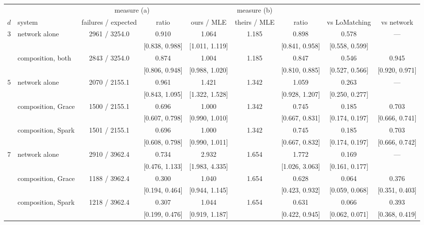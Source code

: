 \begin{tabular}{@{}clccccccc@{}}
\toprule
& & \multicolumn{2}{c}{measure (a)} & \multicolumn{3}{c}{measure (b)} & & \\
\cmidrule(lr){3-4}\cmidrule(lr){5-7}
$d$ & system & failures / expected & ratio & ours / MLE & theirs / MLE & ratio & vs LoMatching & vs network \\
\midrule
3 & network alone & 2961 / 3254.0 & 0.910 & 1.064 & 1.185 & 0.898 & 0.578 & --- \\
 &  &  & {\tiny[0.838, 0.988]} & {\tiny[1.011, 1.119]} &  & {\tiny[0.841, 0.958]} & {\tiny[0.558, 0.599]} &  \\
 & composition, both & 2843 / 3254.0 & 0.874 & 1.004 & 1.185 & 0.847 & 0.546 & 0.945 \\
 &  &  & {\tiny[0.806, 0.948]} & {\tiny[0.988, 1.020]} &  & {\tiny[0.810, 0.885]} & {\tiny[0.527, 0.566]} & {\tiny[0.920, 0.971]} \\
\midrule
5 & network alone & 2070 / 2155.1 & 0.961 & 1.421 & 1.342 & 1.059 & 0.263 & --- \\
 &  &  & {\tiny[0.843, 1.095]} & {\tiny[1.322, 1.528]} &  & {\tiny[0.928, 1.207]} & {\tiny[0.250, 0.277]} &  \\
 & composition, Grace & 1500 / 2155.1 & 0.696 & 1.000 & 1.342 & 0.745 & 0.185 & 0.703 \\
 &  &  & {\tiny[0.607, 0.798]} & {\tiny[0.990, 1.010]} &  & {\tiny[0.667, 0.831]} & {\tiny[0.174, 0.197]} & {\tiny[0.666, 0.741]} \\
 & composition, Spark & 1501 / 2155.1 & 0.696 & 1.000 & 1.342 & 0.745 & 0.185 & 0.703 \\
 &  &  & {\tiny[0.608, 0.798]} & {\tiny[0.990, 1.011]} &  & {\tiny[0.667, 0.832]} & {\tiny[0.174, 0.197]} & {\tiny[0.666, 0.742]} \\
\midrule
7 & network alone & 2910 / 3962.4 & 0.734 & 2.932 & 1.654 & 1.772 & 0.169 & --- \\
 &  &  & {\tiny[0.476, 1.133]} & {\tiny[1.983, 4.335]} &  & {\tiny[1.026, 3.063]} & {\tiny[0.161, 0.177]} &  \\
 & composition, Grace & 1188 / 3962.4 & 0.300 & 1.040 & 1.654 & 0.628 & 0.064 & 0.376 \\
 &  &  & {\tiny[0.194, 0.464]} & {\tiny[0.944, 1.145]} &  & {\tiny[0.423, 0.932]} & {\tiny[0.059, 0.068]} & {\tiny[0.351, 0.403]} \\
 & composition, Spark & 1218 / 3962.4 & 0.307 & 1.044 & 1.654 & 0.631 & 0.066 & 0.393 \\
 &  &  & {\tiny[0.199, 0.476]} & {\tiny[0.919, 1.187]} &  & {\tiny[0.422, 0.945]} & {\tiny[0.062, 0.071]} & {\tiny[0.368, 0.419]} \\
\bottomrule
\end{tabular}
